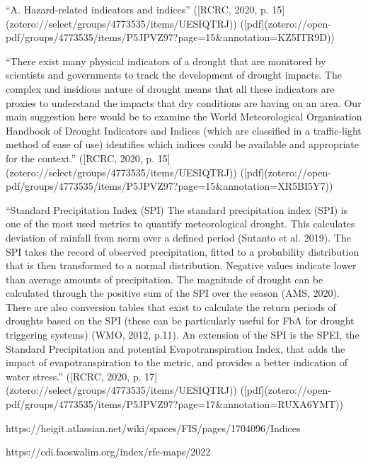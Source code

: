 {“A. Hazard-related indicators and indices” ([RCRC, 2020, p. 15](zotero://select/groups/4773535/items/UESIQTRJ)) ([pdf](zotero://open-pdf/groups/4773535/items/P5JPVZ97?page=15&annotation=KZ5ITR9D))

“There exist many physical indicators of a drought that are monitored by scientists and governments to track the development of drought impacts. The complex and insidious nature of drought means that all these indicators are proxies to understand the impacts that dry conditions are having on an area. Our main suggestion here would be to examine the World Meteorological Organisation Handbook of Drought Indicators and Indices (which are classified in a traffic-light method of ease of use) identifies which indices could be available and appropriate for the context.” ([RCRC, 2020, p. 15](zotero://select/groups/4773535/items/UESIQTRJ)) ([pdf](zotero://open-pdf/groups/4773535/items/P5JPVZ97?page=15&annotation=XR5BI5Y7))


“Standard Precipitation Index (SPI) The standard precipitation index (SPI) is one of the most used metrics to quantify meteorological drought. This calculates deviation of rainfall from norm over a defined period (Sutanto et al. 2019). The SPI takes the record of observed precipitation, fitted to a probability distribution that is then transformed to a normal distribution. Negative values indicate lower than average amounts of precipitation. The magnitude of drought can be calculated through the positive sum of the SPI over the season (AMS, 2020). There are also conversion tables that exist to calculate the return periods of droughts based on the SPI (these can be particularly useful for FbA for drought triggering systems) (WMO, 2012, p.11). An extension of the SPI is the SPEI, the Standard Precipitation and potential Evapotranspiration Index, that adds the impact of evapotranspiration to the metric, and provides a better indication of water stress.” ([RCRC, 2020, p. 17](zotero://select/groups/4773535/items/UESIQTRJ)) ([pdf](zotero://open-pdf/groups/4773535/items/P5JPVZ97?page=17&annotation=RUXA6YMT))

https://heigit.atlassian.net/wiki/spaces/FIS/pages/1704096/Indices



https://cdi.faoswalim.org/index/rfe-maps/2022



}
